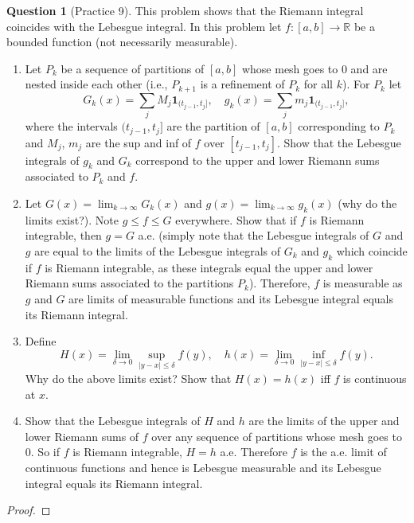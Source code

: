\documentclass{article}
\theoremstyle{definition} %
\numberwithin{thm}{section} %
\theoremstyle{definition} %
\newtheorem{question}[thm]{Question}
\begin{document}
\begin{question}[Practice 9]
This problem shows that the Riemann integral coincides with the Lebesgue integral. In this problem let $f : [a, b] \to \mathbb{R}$ be a bounded function (not necessarily measurable).
\begin{enumerate}[label=(\alph*)]
    \item Let $P_k$ be a sequence of partitions of $[a, b]$ whose mesh goes to 0 and are nested inside each other (i.e., $P_{k+1}$ is a refinement of $P_k$ for all $k$). For $P_k$ let
    \[
    G_k(x) = \sum_j M_j \mathbf{1}_{(t_{j-1}, t_j]}, \quad g_k(x) = \sum_j m_j \mathbf{1}_{(t_{j-1}, t_j]},
    \]
    where the intervals $(t_{j-1}, t_j]$ are the partition of $[a, b]$ corresponding to $P_k$ and $M_j$, $m_j$ are the sup and inf of $f$ over $[t_{j-1}, t_j]$. Show that the Lebesgue integrals of $g_k$ and $G_k$ correspond to the upper and lower Riemann sums associated to $P_k$ and $f$.
    
    \item Let $G(x) = \lim_{k \to \infty} G_k(x)$ and $g(x) = \lim_{k \to \infty} g_k(x)$ (why do the limits exist?). Note $g \leq f \leq G$ everywhere. Show that if $f$ is Riemann integrable, then $g = G$ a.e. (simply note that the Lebesgue integrals of $G$ and $g$ are equal to the limits of the Lebesgue integrals of $G_k$ and $g_k$ which coincide if $f$ is Riemann integrable, as these integrals equal the upper and lower Riemann sums associated to the partitions $P_k$). Therefore, $f$ is measurable as $g$ and $G$ are limits of measurable functions and its Lebesgue integral equals its Riemann integral.
    
    \item Define
    \[
    H(x) = \lim_{\delta \to 0} \sup_{|y - x| \leq \delta} f(y), \quad h(x) = \lim_{\delta \to 0} \inf_{|y - x| \leq \delta} f(y).
    \]
    Why do the above limits exist? Show that $H(x) = h(x)$ iff $f$ is continuous at $x$.
    
    \item Show that the Lebesgue integrals of $H$ and $h$ are the limits of the upper and lower Riemann sums of $f$ over any sequence of partitions whose mesh goes to 0. So if $f$ is Riemann integrable, $H = h$ a.e. Therefore $f$ is the a.e. limit of continuous functions and hence is Lebesgue measurable and its Lebesgue integral equals its Riemann integral.
\end{enumerate}
\end{question}
\begin{proof}

\end{proof}
    
\end{document}
